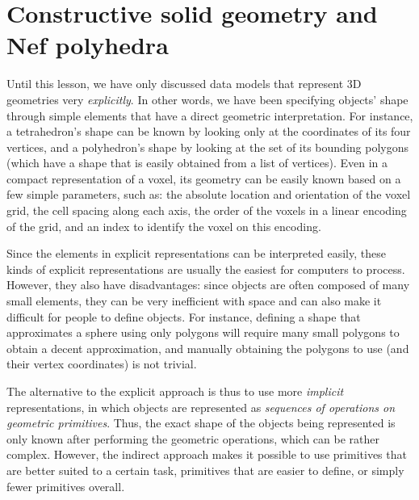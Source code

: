 
\setchapterpreamble[u]{\margintoc}

\graphicspath{{csg_nef/}}

\chapter{Constructive solid geometry and Nef polyhedra}%
\label{chap:csg_nef}


Until this lesson, we have only discussed data models that represent 3D geometries very \emph{explicitly}.
In other words, we have been specifying objects' shape through simple elements that have a direct geometric interpretation.
For instance, a tetrahedron's shape can be known by looking only at the coordinates of its four vertices, and a polyhedron's shape by looking at the set of its bounding polygons (which have a shape that is easily obtained from a list of vertices).
Even in a compact representation of a voxel, its geometry can be easily known based on a few simple parameters, such as: the absolute location and orientation of the voxel grid, the cell spacing along each axis, the order of the voxels in a linear encoding of the grid, and an index to identify the voxel on this encoding.


Since the elements in explicit representations can be interpreted easily, these kinds of explicit representations are usually the easiest for computers to process.
However, they also have disadvantages: since objects are often composed of many small elements, they can be very inefficient with space and can also make it difficult for people to define objects.
For instance, defining a shape that approximates a sphere using only polygons will require many small polygons to obtain a decent approximation, and manually obtaining the polygons to use (and their vertex coordinates) is not trivial.


The alternative to the explicit approach is thus to use more \emph{implicit} representations, in which objects are represented as \emph{sequences of operations on geometric primitives}.
Thus, the exact shape of the objects being represented is only known after performing the geometric operations, which can be rather complex.
However, the indirect approach makes it possible to use primitives that are better suited to a certain task, primitives that are easier to define, or simply fewer primitives overall.


